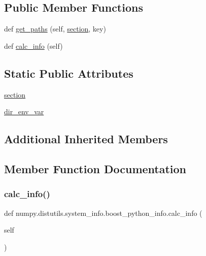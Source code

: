 \subsection*{Public Member Functions}
\begin{DoxyCompactItemize}
\item 
def \hyperlink{classnumpy_1_1distutils_1_1system__info_1_1boost__python__info_a428a2f69c58d04bdb6153d5f2425730d}{get\+\_\+paths} (self, \hyperlink{classnumpy_1_1distutils_1_1system__info_1_1boost__python__info_a899d7250ff2364df7c97c90ae83b8684}{section}, key)
\item 
def \hyperlink{classnumpy_1_1distutils_1_1system__info_1_1boost__python__info_a569b541a900f7206a779f3cb9a6f5d26}{calc\+\_\+info} (self)
\end{DoxyCompactItemize}
\subsection*{Static Public Attributes}
\begin{DoxyCompactItemize}
\item 
\hyperlink{classnumpy_1_1distutils_1_1system__info_1_1boost__python__info_a899d7250ff2364df7c97c90ae83b8684}{section}
\item 
\hyperlink{classnumpy_1_1distutils_1_1system__info_1_1boost__python__info_a42d3efc45c1fe41d57ff60619149a41c}{dir\+\_\+env\+\_\+var}
\end{DoxyCompactItemize}
\subsection*{Additional Inherited Members}


\subsection{Member Function Documentation}
\mbox{\label{classnumpy_1_1distutils_1_1system__info_1_1boost__python__info_a569b541a900f7206a779f3cb9a6f5d26}} 
\subsubsection{\texorpdfstring{calc\+\_\+info()}{calc\_info()}}
{\footnotesize\ttfamily def numpy.\+distutils.\+system\+\_\+info.\+boost\+\_\+python\+\_\+info.\+calc\+\_\+info (\begin{DoxyParamCaption}\item[{}]{self }\end{DoxyParamCaption})}

